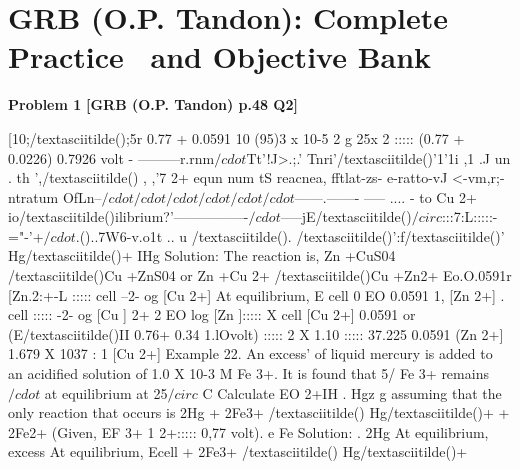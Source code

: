 \chapter{GRB (O.P. Tandon): Complete Practice \ and  Objective Bank}
\label{chap:grb_all_questions}

\begin{problembox}
\textbf{Problem 1} \hfill \textbf{[GRB (O.P. Tandon) p.48 Q2]}
\label{q:ext-grb_all_questions-1}

[10;/textasciitilde();5r 
\underline{\hspace{1cm}} 0.77 + 0.0591 10 (95)3 x 10-5 
2 
g 
25x 2 
::::: 
(0.77 + 0.0226) 
0.7926 volt 
- ---------r.rnm$/cdot$Tt'!J>.;.' Tnri'/textasciitilde()'1'1i ,1 
.J un 
. th 
',/textasciitilde() , 
,'7 2+ 
equn num tS reacnea, fftlat-zs-
e-ratto-vJ <-vm,r;-ntratum OfLn--$/cdot$$/cdot$$/cdot$$/cdot$$/cdot$$/cdot$------.------- -----\underline{\hspace{1cm}} 
.... \underline{\hspace{1cm}}-
to Cu 2+ io/textasciitilde()ilibrium?\underline{\hspace{1cm}}'----------------$/cdot$-----jE/textasciitilde()$/circ$:::\underline{\hspace{1cm}}7:L\underline{\hspace{1cm}}:::::-="-'+\underline{\hspace{1cm}}$/cdot$.()..7\underline{\hspace{1cm}}W6-v.o1t\underline{\hspace{1cm}} 
.. u 
/textasciitilde(). /textasciitilde()':f/textasciitilde()' 
Hg/textasciitilde()+ IHg 
Solution: The reaction is, 
Zn +CuS04 /textasciitilde()Cu +ZnS04 
or 
Zn +Cu 2+ /textasciitilde()Cu +Zn2+ 
Eo.O.0591r [Zn.2:+-\underline{\hspace{1cm}}L 
::::: 
cell --2- og [Cu 2+] 
At equilibrium, E cell 
0 
EO 
0.0591 1, [Zn 2+] . 
cell ::::: -2- og [Cu 
] 
2+ 
2 
EO 
log [Zn 
]::::: 
X 
cell 
[Cu 2+] 
0.0591 
or 
(E/textasciitilde()II 
0.76+ 0.34 
1.lOvolt) 
::::: 2 X 1.10 ::::: 37.225 
0.0591 
(Zn 2+] 
1.679 X 1037 : 1 
[Cu 2+] 
Example 22. An excess' of liquid mercury is added to an 
acidified solution of 1.0 X 10-3 M Fe 3+. It is found that 5/%
Fe 3+ remains$/cdot$ at equilibrium at 25$/circ$ C Calculate EO 2+IH 
. 
Hgz 
g 
assuming that the only reaction that occurs is 
2Hg + 2Fe3+ /textasciitilde() 
Hg/textasciitilde()+ + 2Fe2+ 
(Given, EF 3+ 1 
2+::::: 0,77 volt). 
e 
Fe 
Solution: . 
2Hg 
At equilibrium, excess 
At equilibrium, Ecell 
+ 2Fe3+ /textasciitilde() 
Hg/textasciitilde()+ 
$$
\end{problembox}
